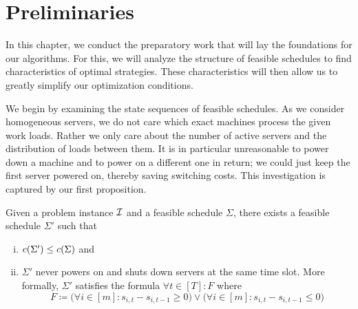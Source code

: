 
\chapter{Preliminaries}\label{chap:preliminaries}
In this chapter, we conduct the preparatory work that will lay the foundations for our algorithms. For this, we will analyze the structure of feasible schedules to find characteristics of optimal strategies. These characteristics will then allow us to greatly simplify our optimization conditions.

We begin by examining the state sequences of feasible schedules. As we consider homogeneous servers, we do not care which exact machines process the given work loads. Rather we only care about the number of active servers and the distribution of loads between them. It is in particular unreasonable to power down a machine and to power on a different one in return; we could just keep the first server powered on, thereby saving switching costs.
This investigation is captured by our first proposition.
\begin{prop}\label{prop:reasonable_switching}
Given a problem instance $\mathcal{I}$ and a feasible schedule $\Sigma$, there exists a feasible schedule $\Sigma'$ such that 
\begin{enumerate}[(i)]
		\item $c(\Sigma')\le c(\Sigma)$ and 
		\item $\Sigma'$ never powers on and shuts down servers at the same time slot. More formally, $\Sigma'$ satisfies the formula $\forall t\in[T]:F$ where
\begin{equation}
	F\coloneqq\bigl(\forall i\in[m]:s_{i,t}-s_{i,t-1}\ge0\bigr)\lor\bigl(\forall i\in[m]:s_{i,t}-s_{i,t-1}\le 0\bigr)\label{eq:reasonable_switching}
\end{equation}\label{itm:cond_reasonable_switching}
\vspace{-\baselineskip}\vspace{-\belowdisplayskip}
\end{enumerate}
\end{prop}
